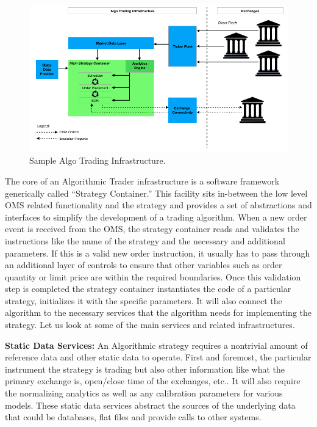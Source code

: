 	\begin{figure}[!ht]
	\centering
	\includegraphics[width=\textwidth]{chapters/chapter_tech/figures/AlgoInfraGraph.png} 
	\caption{Sample Algo Trading Infrastructure. \label{fig:AlgoInfraGraph}}
	\end{figure}
	
The core of an Algorithmic Trader infrastructure is a software framework generically called ``Strategy Container.'' This facility sits in-between the low level OMS related functionality and the strategy and provides a set of abstractions and interfaces to simplify the development of a trading algorithm. When a new order event is received from the OMS, the strategy container reads and validates the instructions like the name of the strategy and the necessary and additional parameters. If this is a valid new order instruction, it usually has to pass through an additional layer of controls to ensure that other variables such as order quantity or limit price are within the required boundaries. Once this validation step is completed the strategy container instantiates the code of a particular strategy, initializes it with the specific parameters. It will also connect the algorithm to the necessary services that the algorithm needs for implementing the strategy. Let us look at some of the main services and related infrastructures. \twomedskip


\noindent\textbf{Static Data Services:} An Algorithmic strategy requires a nontrivial amount of reference data and other static data to operate. First and foremost, the particular instrument the strategy is trading but also other information like what the primary exchange is, open/close time of the exchanges, etc.. It will also require the normalizing analytics as well as any calibration parameters for various models. These static data services abstract the sources of the underlying data that could be databases, flat files and provide calls to other systems. \twomedskip



